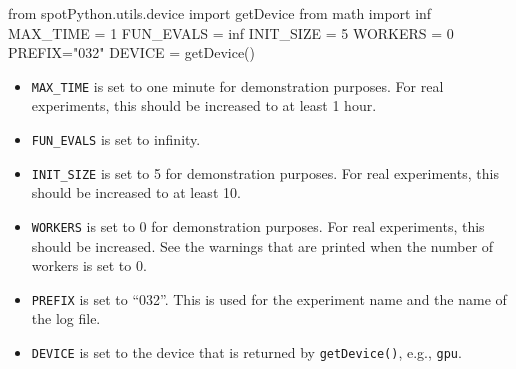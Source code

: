 \documentclass[
  letterpaper,
  DIV=11,
  numbers=noendperiod]{scrreprt}
\newenvironment{Shaded}{\begin{snugshade}}{\end{snugshade}}
\newcommand{\DecValTok}[1]{\textcolor[rgb]{0.68,0.00,0.00}{#1}}
\newcommand{\ImportTok}[1]{\textcolor[rgb]{0.00,0.46,0.62}{#1}}
\newcommand{\NormalTok}[1]{\textcolor[rgb]{0.00,0.23,0.31}{#1}}
\newcommand{\OperatorTok}[1]{\textcolor[rgb]{0.37,0.37,0.37}{#1}}
\newcommand{\StringTok}[1]{\textcolor[rgb]{0.13,0.47,0.30}{#1}}
\providecommand{\tightlist}{%
  \setlength{\itemsep}{0pt}\setlength{\parskip}{0pt}}\usepackage{longtable,booktabs,array}
\begin{document}
\begin{Shaded}
\begin{Highlighting}[]
\ImportTok{from}\NormalTok{ spotPython.utils.device }\ImportTok{import}\NormalTok{ getDevice}
\ImportTok{from}\NormalTok{ math }\ImportTok{import}\NormalTok{ inf}
\NormalTok{MAX\_TIME }\OperatorTok{=} \DecValTok{1}
\NormalTok{FUN\_EVALS }\OperatorTok{=}\NormalTok{ inf}
\NormalTok{INIT\_SIZE }\OperatorTok{=} \DecValTok{5}
\NormalTok{WORKERS }\OperatorTok{=} \DecValTok{0}
\NormalTok{PREFIX}\OperatorTok{=}\StringTok{"032"}
\NormalTok{DEVICE }\OperatorTok{=}\NormalTok{ getDevice()}
\end{Highlighting}
\end{Shaded}

\begin{tcolorbox}[enhanced jigsaw, coltitle=black, bottomrule=.15mm, breakable, toprule=.15mm, colframe=quarto-callout-caution-color-frame, title=\textcolor{quarto-callout-caution-color}{\faFire}\hspace{0.5em}{Caution: Run time and initial design size should be increased for real
experiments}, colbacktitle=quarto-callout-caution-color!10!white, opacityback=0, left=2mm, leftrule=.75mm, colback=white, rightrule=.15mm, bottomtitle=1mm, toptitle=1mm, titlerule=0mm, arc=.35mm, opacitybacktitle=0.6]

\begin{itemize}
\tightlist
\item
  \texttt{MAX\_TIME} is set to one minute for demonstration purposes.
  For real experiments, this should be increased to at least 1 hour.
\item
  \texttt{FUN\_EVALS} is set to infinity.
\item
  \texttt{INIT\_SIZE} is set to 5 for demonstration purposes. For real
  experiments, this should be increased to at least 10.
\item
  \texttt{WORKERS} is set to 0 for demonstration purposes. For real
  experiments, this should be increased. See the warnings that are
  printed when the number of workers is set to 0.
\item
  \texttt{PREFIX} is set to ``032''. This is used for the experiment
  name and the name of the log file.
\item
  \texttt{DEVICE} is set to the device that is returned by
  \texttt{getDevice()}, e.g., \texttt{gpu}.
\end{itemize}

\end{tcolorbox}
\end{document}
